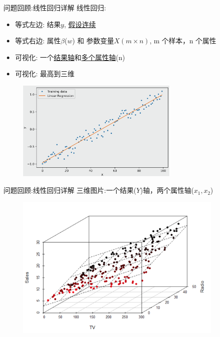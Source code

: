 \documentclass[handout]{ctexbeamer}
\begin{document}
\begin{frame}{问题回顾:线性回归详解}
线性回归:
\begin{itemize}
	\item 等式左边: 结果$y$, \underline{假设连续}
	\item 等式右边: 属性$\beta$($w$) 和 参数变量$X (m \times n)$, m 个样本，n 个属性
	\item 可视化: 一个\underline{结果轴}和\underline{多个属性轴}(n)
	\item 可视化: 最高到三维
\end{itemize}
\begin{figure}[H]
	\centering
	\includegraphics[width=0.7\textwidth]{fig/LinearReg}
\end{figure}
\end{frame}

\begin{frame}{问题回顾:线性回归详解}
三维图片:一个结果($Y$)轴，两个属性轴($x_1, x_2$)	
\begin{figure}[H]
	\centering
	\includegraphics[width=0.9\textwidth]{fig/LinearReg3D}
\end{figure}
\end{frame}
\end{document}

